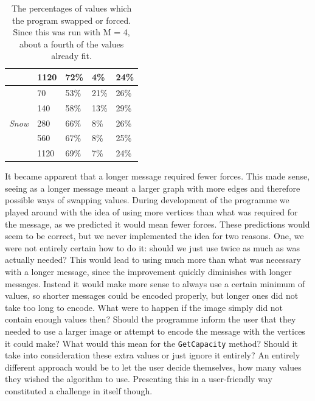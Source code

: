 \begin{table}[]
\begin{tabular}{@{}lllll@{}}
                                    & 1120                    & 72\%           & 4\%             & 24\%                 \\ \midrule
\multirow{5}{*}{\textit{Snow}}      & 70                      & 53\%           & 21\%            & 26\%                 \\
                                    & 140                     & 58\%           & 13\%            & 29\%                 \\
                                    & 280                     & 66\%           & 8\%             & 26\%                 \\
                                    & 560                     & 67\%           & 8\%             & 25\%                 \\
                                    & 1120                    & 69\%           & 7\%             & 24\%                 \\ \bottomrule
\end{tabular}
      \caption{The percentages of values which the program swapped or forced.
Since this was run with M = 4, about a fourth of the values already fit.}
      \label{fig:forces_swaps}
\end{table}

It became apparent that a longer message required fewer forces. 
This made sense, seeing as a longer message meant a larger graph with more edges and therefore possible ways of swapping values.
During development of the programme we played around with the idea of using more vertices than what was required for the message, as we predicted it would mean fewer forces.
These predictions would seem to be correct, but we never implemented the idea for two reasons.
One, we were not entirely certain how to do it: should we just use twice as much as was actually needed?
This would lead to using much more than what was necessary with a longer message, since the improvement quickly diminishes with longer messages.
Instead it would make more sense to always use a certain minimum of values, so shorter messages could be encoded properly, but longer ones did not take too long to encode.
What were to happen if the image simply did not contain enough values then? 
Should the programme inform the user that they needed to use a larger image or attempt to encode the message with the vertices it could make?
What would this mean for the \lstinline|GetCapacity| method? 
Should it take into consideration these extra values or just ignore it entirely?
An entirely different approach would be to let the user decide themselves, how many values they wished the algorithm to use. 
Presenting this in a user-friendly way constituted a challenge in itself though.

